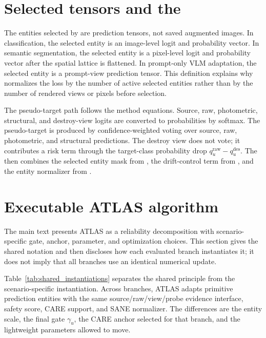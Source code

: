\section{Selected tensors and the \atlasloss{}}
\label{app:selected_tensors}

The entities selected by \core{} are prediction tensors, not saved augmented images. In classification, the selected entity is an image-level logit and probability vector. In semantic segmentation, the selected entity is a pixel-level logit and probability vector after the spatial lattice is flattened. In prompt-only VLM adaptation, the selected entity is a prompt-view prediction tensor. This definition explains why \sane{} normalizes the loss by the number of active selected entities rather than by the number of rendered views or pixels before selection.

The pseudo-target path follows the method equations. Source, raw, photometric, structural, and destroy-view logits are converted to probabilities by softmax. The pseudo-target is produced by confidence-weighted voting over source, raw, photometric, and structural predictions. The destroy view does not vote; it contributes a risk term through the target-class probability drop $q_u^{\mathrm{raw}}-q_u^{\mathrm{des}}$. The \atlasloss{} then combines the selected entity mask from \core{}, the drift-control term from \care{}, and the entity normalizer from \sane{}.

\section{Executable ATLAS algorithm}
\label{app:atlas_executable}

The main text presents ATLAS as a reliability decomposition with scenario-specific gate, anchor, parameter, and optimization choices. This section gives the shared notation and then discloses how each evaluated branch instantiates it; it does not imply that all branches use an identical numerical update.

Table~\ref{tab:shared_instantiations} separates the shared principle from the
scenario-specific instantiation. Across branches, ATLAS adapts primitive
prediction entities with the same source/raw/view/probe evidence interface,
safety score, CARE support, and SANE normalizer. The differences are the entity
scale, the final gate $\gamma_u$, the CARE anchor selected for that branch, and
the lightweight parameters allowed to move.

